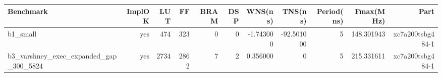 \begin{tabular}{lrrrrrrrrrr}
\hline
Benchmark & ImplOK & LUT & FF & BRAM & DSP & WNS(ns) & TNS(ns) & Period(ns) & Fmax(MHz) & Part \\
\hline
b1\_small & yes & 474 & 323 & 0 & 0 & -1.743000 & -92.501000 & 5 & 148.301943 & xc7a200tsbg484-1 \\
b3\_varshney\_exec\_expanded\_gap\_300\_5824 & yes & 2734 & 2862 & 7 & 2 & 0.356000 & 0 & 5 & 215.331611 & xc7a200tsbg484-1 \\
\hline
\end{tabular}
